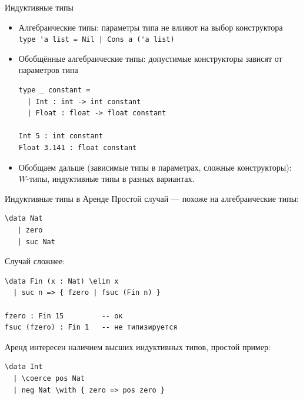 \documentclass[aspectratio=169]{beamer}
\begin{document}
\begin{frame}[fragile]{Индуктивные типы}
\begin{itemize}
\item Алгебраические типы: параметры типа не влияют на выбор конструктора
\small\color[HTML]{025002}
\verb!type 'a list = Nil | Cons a ('a list)!
\normalsize
\color{black}

\item Обобщённые алгебраические типы: допустимые конструкторы зависят от параметров типа
\small\color[HTML]{025002}\begin{verbatim}
type _ constant =
  | Int : int -> int constant
  | Float : float -> float constant

Int 5 : int constant
Float 3.141 : float constant
\end{verbatim}\normalsize 
\color{black}

\item Обобщаем дальше (зависимые типы в параметрах, сложные конструкторы): $W$-типы, индуктивные типы в разных вариантах.
\end{itemize}
\end{frame}


\begin{frame}[fragile]{Индуктивные типы в Аренде}
Простой случай --- похоже на алгебраические типы:
\small\color[HTML]{025002}\begin{verbatim}
\data Nat 
   | zero
   | suc Nat
\end{verbatim}\normalsize
\color{black}

Случай сложнее:
\small\color[HTML]{025002}\begin{verbatim}
\data Fin (x : Nat) \elim x
  | suc n => { fzero | fsuc (Fin n) }

fzero : Fin 15         -- ок
fsuc (fzero) : Fin 1   -- не типизируется
\end{verbatim}
\color{black}


Аренд интересен наличием высших индуктивных типов, простой пример:

\small\color[HTML]{025002}\begin{verbatim}
\data Int
  | \coerce pos Nat
  | neg Nat \with { zero => pos zero }
\end{verbatim}\normalsize
\color{black}

\end{frame}
\end{document}
